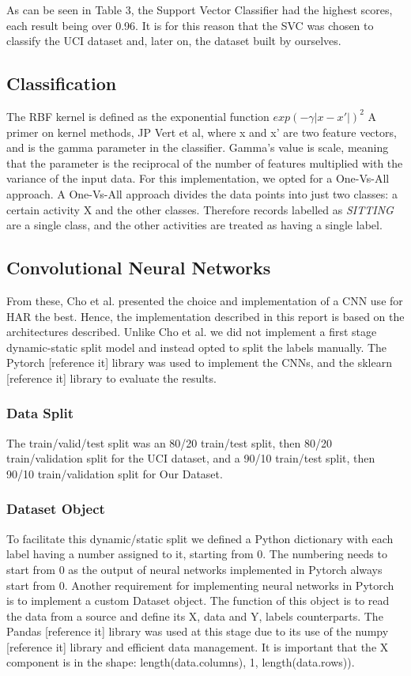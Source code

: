     As can be seen in Table 3, the Support Vector Classifier had the highest scores, each result being over 0.96. It is for this reason that the SVC
    was chosen to classify the UCI dataset \cite{Anguita2013} and, later on, the dataset built by ourselves.

\subsection{Classification}
    The RBF kernel is defined as the exponential function \(exp(-\gamma \lvert x-x' \rvert)^2\) A primer on kernel methods, JP Vert et al, where x and x’ are two feature vectors, and is the
    gamma parameter in the classifier. Gamma’s value is scale, meaning that the parameter is the reciprocal of the number of features multiplied with the variance of the input data.
    For this implementation, we opted for a One-Vs-All approach. A One-Vs-All approach divides the data points into just two classes: a certain activity X and the other classes. Therefore records
    labelled as \emph{SITTING} are a single class, and the other activities are treated as having a single label.

\subsection{Convolutional Neural Networks}
From these, Cho et al. \cite{Cho2018} presented the choice and implementation of a CNN use for HAR the best.
Hence, the implementation described in this report is based on the architectures described.
Unlike Cho et al. we did not implement a first stage dynamic-static split model and instead opted to split the labels manually.
The Pytorch [reference it] library was used to implement the CNNs, and the sklearn [reference it] library to evaluate the results.

\subsubsection{Data Split}
The train/valid/test split was an 80/20 train/test split, then 80/20 train/validation split for the UCI dataset, and a 90/10 train/test split, then 90/10 train/validation split for Our Dataset.

\subsubsection{Dataset Object}
To facilitate this dynamic/static split we defined a Python dictionary with each label having a number assigned to it, starting from 0.
The numbering needs to start from 0 as the output of neural networks implemented in Pytorch always start from 0.
Another requirement for implementing neural networks in Pytorch is to implement a custom Dataset object.
The function of this object is to read the data from a source and define its X, data and Y, labels counterparts.
The Pandas [reference it] library was used at this stage due to its use of the numpy [reference it] library and efficient data management.
It is important that the X component is in the shape: length(data.columns), 1, length(data.rows)).

